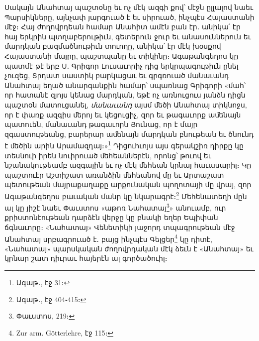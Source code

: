 \documentclass{article}
\begin{document}
{Սակայն Անահտայ պաշտօնը եւ ոչ մէկ ազգի քով՝ մէջն ըլլալով նաեւ Պարսիկները, այնչափ յարգուած է եւ սիրուած, ինչպէս Հայաստանի մէջ։ Հայ ժողովրդեան համար Անահիտ ամէն բան էր․ անիկա՛ էր հայ երկրին պտղաբերութիւն, գետերուն ջուր եւ անասուններուն եւ մարդկան բազմածնութիւն տուողը, անիկա՛ էր մէկ խօսքով Հայաստանի մայրը, պաշտպանը եւ տիկինը։ Ագաթանգեղոս կը պատմէ թէ երբ Ս․ Գրիգոր Լուսաւորիչ դից երկրպագութիւն ընել չուզեց, Տրդատ սաստիկ բարկացաւ եւ գրգռուած մանաւանդ Անահտայ եղած անարգանքին համար՝ սպառնաց Գրիգորի «մահ՝ որ հատանէ զյոյս կենաց մարդկան, եթէ ոչ առնուցուս յանձն դիցն պաշտօն մատուցանել, \emph{մանաւանդ} այսմ ﬔծի Անահտայ տիկնոջս, որ է փառք ազգիս ﬔրոյ եւ կեցուցիչ, զոր եւ թագաւորք աﬔնայն պատուեն, մանաւանդ թագաւորն Յունաց, որ է մայր զգաստութեանց, բարերար աﬔնայն մարդկան բնութեան եւ ծնունդ է ﬔծին արին Արամազդայ։»\footnote{Ագաթ․, էջ 31։} Դիցուհւոյս այս գերակշիռ դիրքը կը տեսնուի իրեն նուիրուած ﬔհեաններէն, որոնց՝ թուով եւ նշանակութեամբ ազգային եւ ոչ մէկ ﬔհեան կրնայ հաւասարիլ։ Կը պաշտուէր Աշտիշատ առանձին ﬔհեանով մը եւ Արտաշատ պետութեան մայրաքաղաքը արքունական պողոտայի մը վրայ, զոր Ագաթանգեղոս բաւական մանր կը նկարագրէ։\footnote{Ագաթ․, էջ 404֊415։} Մեհենատեղի մըն ալ կը յիշէ նաեւ Փաւստոս «աթոռ Նահատայ\footnote{Փաւստոս, 219։}» անուամբ, ուր քրիստոնէութեան դարձէն վերջը կը բնակի եղեր Եպիփան ճգնաւորը։ «Նահատայ» Վենետիկի յաջորդ տպագրութեան մէջ Անահտայ սրբագրուած է․ բայց ինչպէս Գելցեր\footnote{Zur arm. Götterlehre, էջ 115։} կը դիտէ, «Նահատայ» պարսկական ժողովրդական մէկ ձեւն է «Անահտայ» եւ կրնար շատ դիւրաւ հայերէն ալ գործածուիլ։

}
\end{document}
